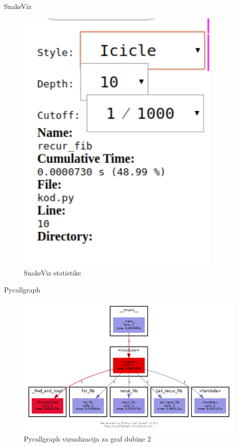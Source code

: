 \documentclass{beamer}
\begin{document}
\begin{frame}{SnakeViz}
\begin{figure}[h!]
\begin{center}
\includegraphics[trim={0cm 0cm 0cm 0cm},clip,scale=0.27]{snakeviz_statistic.png}
\end{center}
\caption{SnakeViz statistike}
\label{fig:snake_viz_2}
\end{figure}
\end{frame}

\begin{frame}{Pycallgraph}
\begin{figure}[h!]
\begin{center}
\includegraphics[scale=0.4]{pycallgraph.png}
\end{center}
\caption{Pycallgraph vizualizacija za graf dubine 2}
\label{fig:pycallgraph2_1}
\end{figure}
\end{frame}
 
\end{document}
